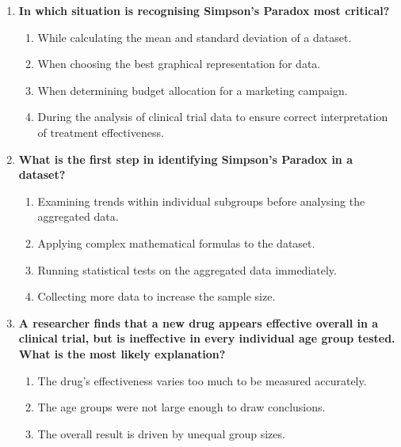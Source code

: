 \documentclass[11pt]{article}
\begin{document}
\begin{enumerate}
    \begin{enumerate}
      \item That it only occurs in healthcare and medicine.
      \item That it can be resolved simply by collecting more data.
      \item That it is a statistical error correctable with mathematical
        formulas.
      \item That it is a type of data visualisation graph.
    \end{enumerate}
  \item \textbf{In which situation is recognising Simpson's Paradox most
    critical?}
    \begin{enumerate}
      \item While calculating the mean and standard deviation of a dataset.
      \item When choosing the best graphical representation for data.
      \item When determining budget allocation for a marketing campaign.
      \item During the analysis of clinical trial data to ensure correct
        interpretation of treatment effectiveness.
    \end{enumerate}
  \item \textbf{What is the first step in identifying Simpson's Paradox
    in a dataset?}
    \begin{enumerate}
      \item Examining trends within individual subgroups before analysing
        the aggregated data.
      \item Applying complex mathematical formulas to the dataset.
      \item Running statistical tests on the aggregated data immediately.
      \item Collecting more data to increase the sample size.
    \end{enumerate}
  \item \textbf{A researcher finds that a new drug appears effective
    overall in a clinical trial, but is ineffective in every individual
    age group tested. What is the most likely explanation?}
    \begin{enumerate}
      \item The drug's effectiveness varies too much to be measured
        accurately.
      \item The age groups were not large enough to draw conclusions.
      \item The overall result is driven by unequal group sizes.

\end{enumerate}
\end{enumerate}
\end{document}
